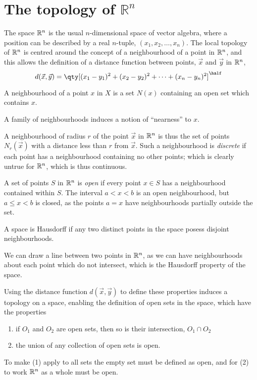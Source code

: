 \section{The topology of $\mathbb{R}^n$}
\label{sec:topology-mathbbrn}

The space $\mathbb{R}^n$ is the usual $n$-dimensional space of vector algebra,
where a position can be described by a real $n$-tuple, $(x_1, x_2,
\dots, x_n)$. The local topology of $\mathbb{R}^n$ is centred around the
concept of a neighbourhood of a point in $\mathbb{R}^n$, and this allows the definition of a distance function between points, $\vec{x}$ and $\vec{y}$ in $\mathbb{R}^n$,
\begin{equation}
  \label{eq:1}
  d(\vec{x},\vec{y}) = \qty[ (x_1 - y_1)^2 + (x_2 - y_2)^2 + \cdots + (x_n - y_n)^2 ]^{\half}
\end{equation}

\begin{definition}[Neighbourhood]
  A neighbourhood of a point $x$ in $X$ is a set $N(x)$ containing an
  open set which contains $x$.
\end{definition}
A family of neighbourhoods induces a notion of ``nearness'' to $x$.

A neighbourhood of radius $r$ of the point $\vec{x}$ in $\mathbb{R}^n$ is thus
the set of points $N_r(\vec{x})$ with a distance less than $r$ from
$\vec{x}$. Such a neighbourhood is \emph{discrete} if each point has a
neighbourhood containing no other points; which is clearly untrue for
$\mathbb{R}^n$, which is thus continuous.

A set of points $S$ in $\mathbb{R}^n$ is \emph{open} if every point $x \in S$ has a
neighbourhood contained within $S$. The interval $a<x<b$ is an open
neighbourhood, but $a \leq x < b$ is closed, as the points $a=x$ have
neighbourhoods partially outside the set.

\begin{definition}
  A space is Hausdorff if any two distinct points in the space posess
  disjoint neighbourhoods.
\end{definition}

We can draw a line between two points in $\mathbb{R}^n$, as we can have
neighbourhoods about each point which do not intersect, which is the
Hausdorff property of the space.

Using the distance function $d(\vec{x}, \vec{y})$ to define these
properties induces a topology on a space, enabling the definition of
open sets in the space, which have the properties
\begin{enumerate}
\item if $O_1$ and $O_2$ are open sets, then so is their intersection, $O_1 \cap O_2$
\item the union of any collection of open sets is open.
\end{enumerate}
To make (1) apply to all sets the empty set must be defined as open, and for (2) to work $\mathbb{R}^n$ as a whole must be open.

